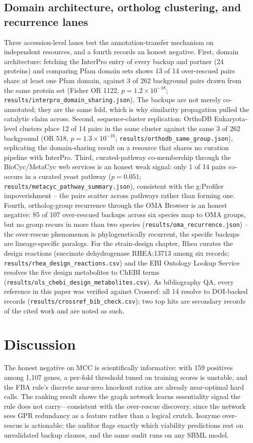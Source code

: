 \documentclass[12pt]{article}
\begin{document}
\subsection{Domain architecture, ortholog clustering, and recurrence lanes}
Three accession-level lanes test the annotation-transfer mechanism on
independent resources, and a fourth records an honest negative. First,
domain architecture: fetching the InterPro entry of every backup and
partner (24 proteins) and comparing Pfam domain sets shows 13 of 14
over-rescued pairs share at least one Pfam domain, against 3 of 262
background pairs drawn from the same protein set (Fisher OR 1122,
$p=1.2\times10^{-18}$; \texttt{results/interpro\_domain\_sharing.json}).
The backups are not merely co-annotated; they are the same fold, which is
why similarity propagation pulled the catalytic claim across. Second,
sequence-cluster replication: OrthoDB Eukaryota-level clusters place
12 of 14 pairs in the same cluster against the same 3 of 262 background
(OR 518, $p=1.3\times10^{-16}$;
\texttt{results/orthodb\_same\_group.json}), replicating the
domain-sharing result on a resource that shares no curation pipeline
with InterPro. Third, curated-pathway co-membership through the
BioCyc/MetaCyc web services is an honest weak signal: only 1 of 14 pairs
co-occurs in a curated yeast pathway ($p=0.051$;
\texttt{results/metacyc\_pathway\_summary.json}), consistent with the
g:Profiler impoverishment -- the pairs scatter across pathways rather
than forming one. Fourth, ortholog-group recurrence through the OMA
Browser is an honest negative: 85 of 107 over-rescued backups across
six species map to OMA groups, but no group recurs in more than two
species (\texttt{results/oma\_recurrence.json}) -- the over-rescue
phenomenon is phylogenetically recurrent, the specific backups are
lineage-specific paralogs. For the strain-design chapter, Rhea curates
the design reactions (succinate dehydrogenase RHEA:13713 among six
records; \texttt{results/rhea\_design\_reactions.csv}) and the EBI
Ontology Lookup Service resolves the five design metabolites to ChEBI
terms (\texttt{results/ols\_chebi\_design\_metabolites.csv}). As
bibliography QA, every reference in this paper was verified against
Crossref: all 14 resolve to DOI-backed records
(\texttt{results/crossref\_bib\_check.csv}); two top hits are secondary
records of the cited work and are noted as such.

\section{Discussion}
The honest negative on MCC is scientifically informative: with 159
positives among 1{,}107 genes, a per-fold threshold tuned on training
scores is unstable, and the FBA rule's discrete near-zero knockout ratios
are already near-optimal hard calls. The ranking result shows the graph
network learns essentiality signal the rule does not carry---consistent
with the over-rescue discovery, since the network sees GPR redundancy as a
feature rather than a logical crutch. Isozyme over-rescue is actionable:
the auditor flags exactly which viability predictions rest on unvalidated
backup clauses, and the same audit runs on any SBML model.
\end{document}
